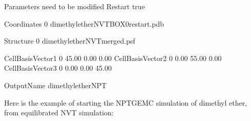 \documentclass[letterpaper,10pt,english]{sphinxmanual}
\begin{document}
\begin{sphinxVerbatim}[commandchars=\\\{\}]
\PYGZsh{}\PYGZsh{}\PYGZsh{}\PYGZsh{}\PYGZsh{}\PYGZsh{}\PYGZsh{}\PYGZsh{}\PYGZsh{}\PYGZsh{}\PYGZsh{}\PYGZsh{}\PYGZsh{}\PYGZsh{}\PYGZsh{}\PYGZsh{}\PYGZsh{}\PYGZsh{}\PYGZsh{}\PYGZsh{}\PYGZsh{}\PYGZsh{}\PYGZsh{}\PYGZsh{}\PYGZsh{}\PYGZsh{}\PYGZsh{}\PYGZsh{}\PYGZsh{}\PYGZsh{}\PYGZsh{}\PYGZsh{}\PYGZsh{}\PYGZsh{}\PYGZsh{}\PYGZsh{}\PYGZsh{}\PYGZsh{}\PYGZsh{}\PYGZsh{}\PYGZsh{}\PYGZsh{}\PYGZsh{}\PYGZsh{}\PYGZsh{}\PYGZsh{}\PYGZsh{}\PYGZsh{}\PYGZsh{}\PYGZsh{}\PYGZsh{}\PYGZsh{}\PYGZsh{}\PYGZsh{}\PYGZsh{}\PYGZsh{}
\PYGZsh{} Parameters need to be modified
\PYGZsh{}\PYGZsh{}\PYGZsh{}\PYGZsh{}\PYGZsh{}\PYGZsh{}\PYGZsh{}\PYGZsh{}\PYGZsh{}\PYGZsh{}\PYGZsh{}\PYGZsh{}\PYGZsh{}\PYGZsh{}\PYGZsh{}\PYGZsh{}\PYGZsh{}\PYGZsh{}\PYGZsh{}\PYGZsh{}\PYGZsh{}\PYGZsh{}\PYGZsh{}\PYGZsh{}\PYGZsh{}\PYGZsh{}\PYGZsh{}\PYGZsh{}\PYGZsh{}\PYGZsh{}\PYGZsh{}\PYGZsh{}\PYGZsh{}\PYGZsh{}\PYGZsh{}\PYGZsh{}\PYGZsh{}\PYGZsh{}\PYGZsh{}\PYGZsh{}\PYGZsh{}\PYGZsh{}\PYGZsh{}\PYGZsh{}\PYGZsh{}\PYGZsh{}\PYGZsh{}\PYGZsh{}\PYGZsh{}\PYGZsh{}\PYGZsh{}\PYGZsh{}\PYGZsh{}\PYGZsh{}\PYGZsh{}\PYGZsh{}
Restart         true

Coordinates     0   dimethylether\PYGZus{}NVT\PYGZus{}BOX\PYGZus{}0\PYGZus{}restart.pdb

Structure       0   dimethylether\PYGZus{}NVT\PYGZus{}merged.psf

\PYGZsh{}CellBasisVector1   0       45.00   0.00    0.00
\PYGZsh{}CellBasisVector2   0       0.00    55.00   0.00
\PYGZsh{}CellBasisVector3   0       0.00    0.00    45.00

OutputName          dimethylether\PYGZus{}NPT
\end{sphinxVerbatim}

Here is the example of starting the NPT\sphinxhyphen{}GEMC simulation of dimethyl ether, from equilibrated NVT simulation:
\end{document}
